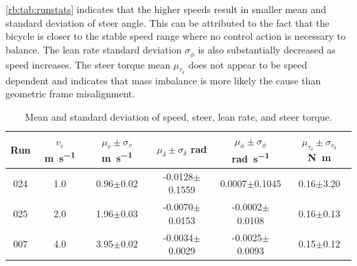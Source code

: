 \autoref{rb:tab:runstats} indicates that the higher speeds result in smaller
mean and standard deviation of steer angle. This can be attributed to the fact
that the bicycle is closer to the stable speed range where no control action is
necessary to balance. The lean rate standard deviation $\sigma_{\dot{\phi}}$ is
also substantially decreased as speed increases. The steer torque mean
$\mu_{\tau_\delta}$ does not appear to be speed dependent and indicates that
mass imbalance is more likely the cause than geometric frame misalignment.

\begin{table}
  \centering
  \begin{tabular}{cccccc}
    \toprule
    Run &
    $v_c$ \si{\m\per\s} &
    $\mu_v \pm \sigma_v$ \si{\m\per\s} &
    $\mu_\delta \pm \sigma_\delta$ \si{\radian} &
    $\mu_{\dot{\phi}} \pm \sigma_{\dot{\phi}}$ \si{\radian\per\s} &
    $\mu_{\tau_\delta} \pm \sigma_{\tau_\delta}$ \si{\N\m} \\
    \midrule
    024 &
    1.0 &
    0.96$\pm$0.02 &
    -0.0128$\pm$0.1559 &
    0.0007$\pm$0.1045 &
    0.16$\pm$3.20 \\
    025 &
    2.0 &
    1.96$\pm$0.03 &
    -0.0070$\pm$0.0153 &
    -0.0002$\pm$0.0108 &
    0.16$\pm$0.13 \\
    007 &
    4.0 &
    3.95$\pm$0.02 &
    -0.0034$\pm$0.0029 &
    -0.0025$\pm$0.0093 &
    0.15$\pm$0.12 \\
    \bottomrule
  \end{tabular}
  \caption{Mean and standard deviation of speed, steer, lean rate, and steer
  torque.}
  \label{rb:tab:runstats}
\end{table}

